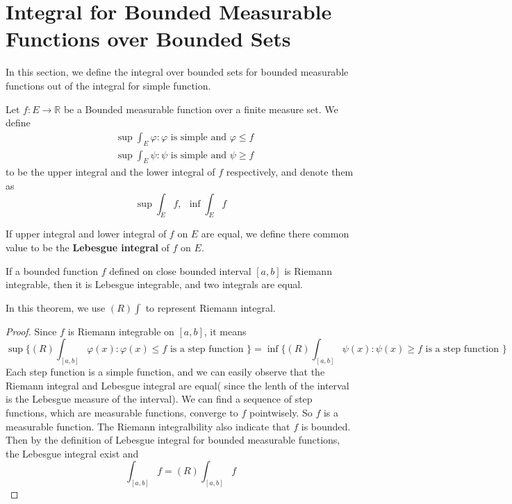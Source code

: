 \documentclass[lang=en, 12pt]{elegantbook}
\newcommand{\RR}{\mathbb{R}}
\begin{document}
        \section{Integral for Bounded Measurable Functions over Bounded Sets}
            In this section, we define the integral over bounded sets for bounded measurable functions out of the integral for simple function.  
            \begin{definition}
                Let $f:E \to \RR$ be a Bounded measurable function over a finite measure set. We define
                \begin{equation*}
                        \begin{aligned}
                            &\sup{\int_E \varphi: \varphi \mbox{ is simple and } \varphi \leq f}\\
                            &\sup{\int_E \psi: \psi \mbox{ is simple and } \psi \geq f}
                        \end{aligned}
                \end{equation*}
            to be the upper integral and the lower integral of $f$ respectively, and denote them as 
            $$\sup \int_E f, \ \ \inf \int_E f $$\par
                If upper integral and lower integral of $f$ on $E$ are equal, we define there common value to be the \textbf{Lebesgue integral}
            of $f$ on $E$. 
            \end{definition}
            \begin{theorem}
                If a bounded function $f$ defined on close bounded interval $[a,b]$ is Riemann integrable, then it is Lebesgue integrable,
            and two integrals are equal.
            \end{theorem}
            In this theorem, we use $(R)\int$ to represent Riemann integral. 
            \begin{proof}
                Since $f$ is Riemann integrable on $[a,b]$, it means 
            $$\sup \{(R)\int_{[a,b]} \varphi(x):\varphi(x)\leq f \mbox{ is a step function }\}
            = \inf \{(R)\int_{[a,b]} \psi(x):\psi(x)\geq f \mbox{ is a step function }\}$$
            Each step function is a simple function, and we can easily observe that the Riemann integral and Lebesgue integral are equal(
            since the lenth of the interval is the Lebesgue measure of the interval).
            We can find a sequence of step functions, which are measurable functions, converge to $f$ pointwisely. So $f$ is a measurable 
            function. The Riemann integralbility also indicate that $f$ is bounded. Then by the definition of Lebesgue integral for bounded
            measurable functions, the Lebesgue integral exist and $$\int_{[a,b]} f = (R) \int_{[a,b]} f$$                
            \end{proof}
\end{document}
